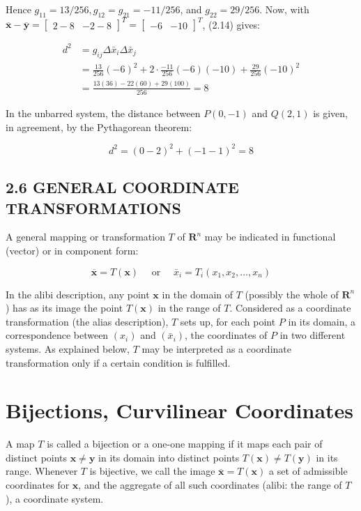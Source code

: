 \documentclass[10pt]{article}
\begin{document}
Hence $g_{11}=13 / 256, g_{12}=g_{21}=-11 / 256$, and $g_{22}=29 / 256$. Now, with $\overline{\mathbf{x}}-\overline{\mathbf{y}}=\left[\begin{array}{ll}2-8 & -2-8\end{array}\right]^{T}=\left[\begin{array}{ll}-6 & -10\end{array}\right]^{T}$, (2.14) gives:

$$
\begin{aligned}
d^{2} & =g_{i j} \Delta \bar{x}_{i} \Delta \bar{x}_{j} \\
& =\frac{13}{256}(-6)^{2}+2 \cdot \frac{-11}{256}(-6)(-10)+\frac{29}{256}(-10)^{2} \\
& =\frac{13(36)-22(60)+29(100)}{256}=8
\end{aligned}
$$

In the unbarred system, the distance between $P(0,-1)$ and $Q(2,1)$ is given, in agreement, by the Pythagorean theorem:

$$
d^{2}=(0-2)^{2}+(-1-1)^{2}=8
$$

\subsection*{2.6 GENERAL COORDINATE TRANSFORMATIONS}
A general mapping or transformation $T$ of $\mathbf{R}^{n}$ may be indicated in functional (vector) or in component form:

$$
\overline{\mathbf{x}}=T(\mathbf{x}) \quad \text { or } \quad \bar{x}_{i}=T_{i}\left(x_{1}, x_{2}, \ldots, x_{n}\right)
$$

In the alibi description, any point $\mathbf{x}$ in the domain of $T$ (possibly the whole of $\mathbf{R}^{n}$ ) has as its image the point $T(\mathbf{x})$ in the range of $T$. Considered as a coordinate transformation (the alias description), $T$ sets up, for each point $P$ in its domain, a correspondence between $\left(x_{i}\right)$ and $\left(\bar{x}_{i}\right)$, the coordinates of $P$ in two different systems. As explained below, $T$ may be interpreted as a coordinate transformation only if a certain condition is fulfilled.

\section*{Bijections, Curvilinear Coordinates}
A map $T$ is called a bijection or a one-one mapping if it maps each pair of distinct points $\mathbf{x} \neq \mathbf{y}$ in its domain into distinct points $T(\mathbf{x}) \neq T(\mathbf{y})$ in its range. Whenever $T$ is bijective, we call the image $\overline{\mathbf{x}}=T(\mathbf{x})$ a set of admissible coordinates for $\mathbf{x}$, and the aggregate of all such coordinates (alibi: the range of $T$ ), a coordinate system.
\end{document}
